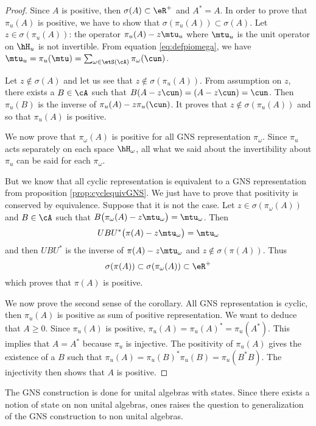 \begin{proof}
Since $A$ is positive, then $\sigma(A)\subset\eR^+$ and $A^*=A$. In order to prove that $\pi_u(A)$ is positive, we have to show that $\sigma(\pi_u(A))\subset\sigma(A)$. Let $z\in\sigma(\pi_u(A))$: the operator $\pi_u(A)-z\mtu_u$ where $\mtu_u$ is the unit operator on $\hH_u$ is not invertible. From equation  \eqref{eq:defpiomega},  we have $\mtu_u=\pi_u(\mtu)=\sum_{\omega\in\etS(\cA)}\pi_{\omega}(\cun)$. 
 
Let $z\notin\sigma(A)$ and let us see that $z\notin\sigma(\pi_u(A))$. From assumption on $z$, there exists a $B\in\cA$ such that $B(A-z\cun)=(A-z\cun)=\cun$. Then $\pi_u(B)$ is the inverse of $\pi_u(A)-z\pi_u(\cun)$. It proves that $z\notin\sigma(\pi_u(A))$ and so that $\pi_u(A)$ is positive.

We now prove that $\pi_{\omega}(A)$ is positive for all GNS representation $\pi_{\omega}$. Since $\pi_u$ acts separately on each space $\hH_{\omega}$, all what we said about the invertibility about $\pi_u$ can be said for each $\pi_{\omega}$.

But we know that all cyclic representation is equivalent to a GNS representation from proposition \ref{prop:cyclequivGNS}. We just have to prove that positivity is conserved by equivalence. Suppose that it is not the case. Let $z\in\sigma(\pi_{\omega}(A))$ and $B\in\cA$ such that $B\big( \pi_{\omega}(A)-z\mtu_{\omega} \big)=\mtu_{\omega}$. Then 
\[ 
  UBU^*\big( \pi(A)-z\mtu_{\omega} \big)=\mtu_{\omega}
\]
and then $UBU^*$ is the inverse of $\pi(A)-z\mtu_{\omega}$ and $z\notin\sigma(\pi(A))$. Thus
\[ 
  \sigma(\pi(A))\subset\sigma(\pi_{\omega}(A))\subset\eR^+
\]
which proves that $\pi(A)$ is positive.

We now prove the second sense of the corollary. All GNS representation is cyclic, then $\pi_u(A)$ is positive as sum of positive representation. We want to deduce that $A\geq0$. Since $\pi_u(A)$ is positive, $\pi_u(A)=\pi_u(A)^*=\pi_u(A^*)$. This implies that $A=A^*$ because $\pi_u$ is injective. The positivity of $\pi_u(A)$ gives the existence of a $B$ such that  $\pi_u(A)=\pi_u(B)^*\pi_u(B)=\pi_u(B^*B)$. The injectivity then shows that $A$ is positive.

\end{proof}

The GNS construction is done for unital algebras with states. Since there exists a notion of state on non unital algebras, ones raises the question to generalization of the GNS construction to non unital algebras.

